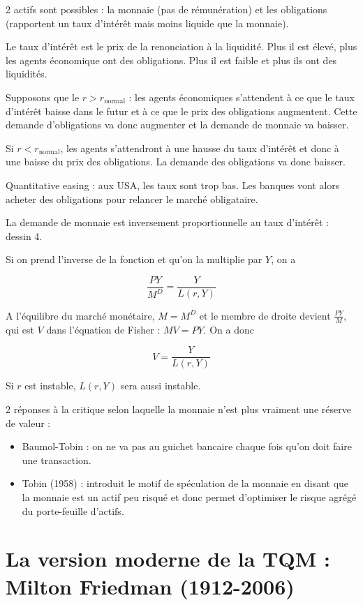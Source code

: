 	2 actifs sont possibles : la monnaie (pas de rémunération) et les obligations (rapportent un taux d'intérêt mais moins liquide que la monnaie).
	
	Le taux d'intérêt est le prix de la renonciation à la liquidité. Plus il est élevé, plus les agents économique ont des obligations. Plus il est faible et plus ils ont des liquidités.
	
	Supposons que le $r > r_{\text{normal}}$ : les agents économiques s'attendent à ce que le taux d'intérêt baisse dans le futur et à ce que le prix des obligations augmentent. Cette demande d'obligations va donc augmenter et la demande de monnaie va baisser.
	
	Si $r < r_{\text{normal}}$, les agents s'attendront à une hausse du taux d'intérêt et donc à une baisse du prix des obligations. La demande des obligations va donc baisser.
	
	Quantitative easing : aux USA, les taux sont trop bas. Les banques vont alors acheter des obligations pour relancer le marché obligataire. 
	
	La demande de monnaie est inversement proportionnelle au taux d'intérêt : dessin 4.
	
	Si on prend l'inverse de la fonction et qu'on la multiplie par $Y$, on a
	
	$$\frac{PY}{M^D} = \frac{Y}{L(r, Y)}$$
	
	A l'équilibre du marché monétaire, $M = M^D$ et le membre de droite devient $\frac{PY}{M}$, qui est $V$ dans l'équation de Fisher : $MV = PY$. On a donc
	
	$$V = \frac{Y}{L(r, Y)}$$
	
	Si $r$ est instable, $L(r, Y)$ sera aussi instable.
	
	2 réponses à la critique selon laquelle la monnaie n'est plus vraiment une réserve de valeur :
	
	\begin{itemize}
		\item Baumol-Tobin : on ne va pas au guichet bancaire chaque fois qu'on doit faire une transaction.
		\item Tobin (1958) : introduit le motif de spéculation de la monnaie en disant que la monnaie est un actif peu risqué et donc permet d'optimiser le risque agrégé du porte-feuille d'actifs.
	\end{itemize}
	
	
\section{La version moderne de la TQM : Milton Friedman (1912-2006)}

